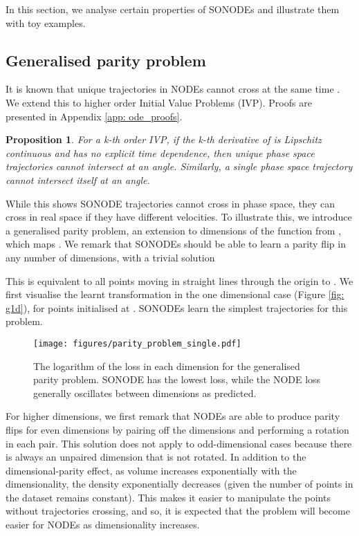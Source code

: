 \documentclass{article}
\newtheorem{proposition}[theorem]{Proposition}
\theoremstyle{remark}
\theoremstyle{definition}
\begin{document}
In this section, we analyse certain properties of SONODEs and illustrate them with toy examples.

\subsection{Generalised parity problem}

It is known that unique trajectories in NODEs cannot cross at the same time \citep{dupont2019augmented, massaroli2020dissecting}. We extend this to higher order Initial Value Problems (IVP). Proofs are presented in Appendix \ref{app: ode_proofs}.

\begin{proposition}
\label{prop: no_crossing_different}
For a k-th order IVP, if the k-th derivative of  is Lipschitz continuous and has no explicit time dependence, then unique phase space trajectories cannot intersect at an angle. Similarly, a single phase space trajectory cannot intersect itself at an angle.
\end{proposition}

While this shows SONODE trajectories cannot cross in phase space, they can cross in real space if they have different velocities. To illustrate this, we introduce a generalised parity problem, an extension to  dimensions of the  function from \citet{dupont2019augmented}, which maps . We remark that SONODEs should be able to learn a parity flip in any number of dimensions, with a trivial solution

This is equivalent to all points moving in straight lines through the origin to . We first visualise the learnt transformation in the one dimensional case (Figure \ref{fig: g1d}), for points initialised at . SONODEs learn the simplest trajectories for this problem.

\begin{wrapfigure}{li}{0.4\textwidth}
\centering
    \texttt{[image: figures/parity\_problem\_single.pdf]}
    \vspace{-10pt}
    \caption{The logarithm of the loss in each dimension for the generalised parity problem. SONODE has the lowest loss, while the NODE loss generally oscillates between dimensions as predicted.}
    \label{fig: parity_multi_dimensions}
\end{wrapfigure}

For higher dimensions, we first remark that NODEs are able to produce parity flips for even dimensions by pairing off the dimensions and performing a  rotation in each pair. This solution does not apply to odd-dimensional cases because there is always an unpaired dimension that is not rotated.
In addition to the dimensional-parity effect, as volume increases exponentially with the dimensionality, the density exponentially decreases (given the number of points in the dataset remains constant). This makes it easier to manipulate the points without trajectories crossing, and so, it is expected that the problem will become easier for NODEs as dimensionality increases.
\end{document}
